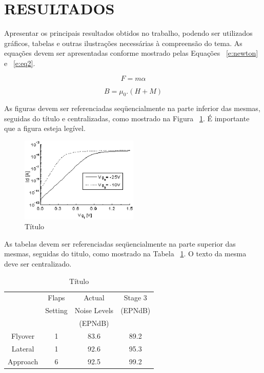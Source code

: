 \documentclass[]{seti2}
\begin{document}
\section{RESULTADOS}
Apresentar os principais resultados obtidos no trabalho, podendo ser utilizados gráficos, tabelas e outras ilustrações necessárias à compreensão do tema.
As equações devem ser apresentadas conforme mostrado pelas Equações \ \ref{e:newton} e \ \ref{e:eq2}.

\begin{equation}
		\label{e:newton}
		F=m\alpha
\end{equation}

\begin{equation}
		\label{e:eq2} %
		B=\mu_{0}.(H+M)	
\end{equation}

As figuras devem ser referenciadas seqüencialmente na parte inferior das mesmas, seguidas do título e centralizadas, como mostrado na Figura \ \ref{figuraAEIOU}. É importante que a figura esteja legível. 

\begin{figure}[htbp!]
		\centering
		\includegraphics[width=0.5\textwidth]{./figs/Figura1.eps}
		\caption{Título}
		\label{figuraAEIOU}	%
\end{figure}

As tabelas devem ser referenciadas seqüencialmente na parte superior das mesmas, seguidas do titulo, como mostrado na Tabela \ \ref{tabelaUOIEA}. O texto da mesma deve ser centralizado.

\begin{table}
		\centering
		\begin{tabular}{|c|c|c|c|}\hline
							& Flaps & Actual & Stage 3 \\ 
							& Setting & Noise Levels & (EPNdB)  \\
							&         & (EPNdB)      &          \\ \hline
			Flyover & 1 & 83.6  & 89.2 \\ \hline
			Lateral & 1 & 92.6  & 95.3 \\ \hline
			Approach & 6 & 92.5  & 99.2 \\ \hline
		\end{tabular}
		\caption{Título}
		\label{tabelaUOIEA}
\end{table}
\end{document}
